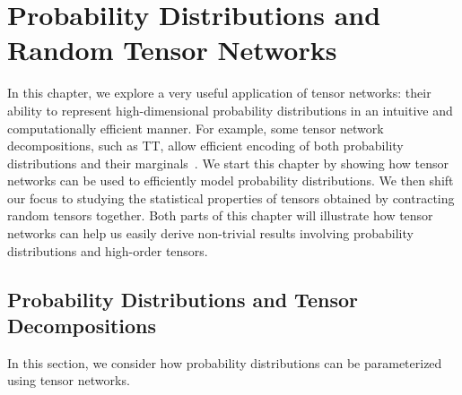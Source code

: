 \section{Probability Distributions and Random Tensor Networks}\label{chapter:prob}
In this chapter, we explore a very useful application of tensor networks: their ability to represent high-dimensional probability distributions in an intuitive and computationally efficient manner. For example, some tensor network decompositions, such as TT, allow efficient encoding of both probability distributions and their marginals~\citep{gardiner2024tensor, glasser2019expressive}. We start this chapter by showing how tensor networks can be used to efficiently model probability distributions. We then shift our focus to studying the statistical properties of tensors obtained by contracting random tensors together. Both parts of this chapter will illustrate how tensor networks can help us easily derive non-trivial results involving probability distributions and high-order tensors. 
\subsection{Probability Distributions and Tensor Decompositions}
In this section, we consider how probability distributions can be parameterized using tensor networks.
